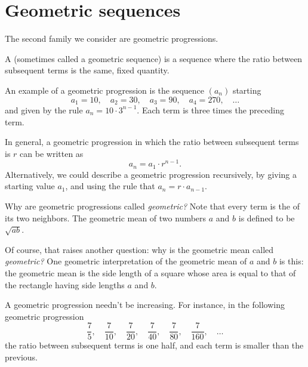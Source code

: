 \documentclass{ximera}
\begin{document}
\section{Geometric sequences}


The second family we consider are geometric progressions.


\begin{definition}
  A  (sometimes called a geometric
  sequence) is a sequence where the ratio
  between subsequent terms is the same, fixed quantity.
\end{definition}

\begin{example}
  An example of a geometric progression is the sequence $(a_n)$ starting
  $$
  a_1 = 10, \quad a_2 = 30, \quad a_3 = 90, \quad a_4 = 270, \quad\ldots
  $$
  and given by the rule $a_n = 10 \cdot 3^{n-1}$.  Each term is three
  times the preceding term.
\end{example}

In general, a geometric progression in which the ratio between
subsequent terms is $r$ can be written as
$$
a_n = a_1 \cdot r^{n-1}.
$$
Alternatively, we could describe a geometric progression
recursively, by giving a starting value $a_1$, and using the rule that
$a_{n} = r \cdot a_{n-1}$.

\begin{remark}
Why are geometric progressions called \textit{geometric?}  Note that every term is the  of its two neighbors.  The geometric mean of two numbers $a$ and $b$ is defined to be $\sqrt{ab}$.

Of course, that raises another question: why is the geometric mean called \textit{geometric?}  One geometric interpretation of the geometric mean of $a$ and $b$ is this: the geometric mean is the side length of a square whose area is equal to that of the rectangle having side lengths $a$ and $b$.
\end{remark}

A geometric progression needn't be increasing.  For instance, in the following geometric progression
$$
\frac{7}{5}, \quad \frac{7}{10}, \quad \frac{7}{20}, \quad \frac{7}{40}, \quad \frac{7}{80}, \quad \frac{7}{160}, \quad\ldots
$$
the ratio between subsequent terms is one half, and each term is smaller than the previous.
\end{document}
